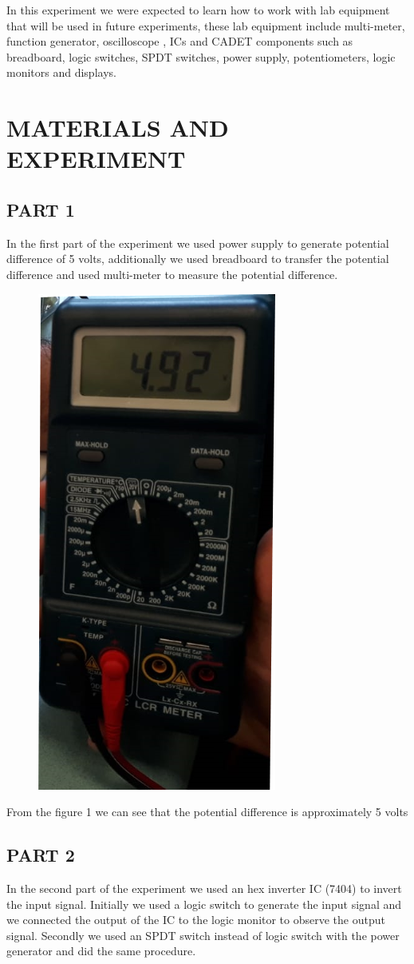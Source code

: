 \documentclass[pdftex,12pt,a4paper]{article}
\begin{document}
In this experiment we were expected to learn how to work with lab equipment that will be used in future experiments, these lab equipment include multi-meter, function generator, oscilloscope , ICs and CADET components such as breadboard, logic switches, SPDT switches, power supply, potentiometers, logic monitors and displays.

\section{MATERIALS AND EXPERIMENT}

\subsection{PART 1}
In the first part of the experiment we used power supply to generate potential difference of 5 volts, additionally we used breadboard to transfer the potential difference and used multi-meter to measure the potential difference.

\begin{figure}[h]
	\centering
	\includegraphics[height=0.5\textwidth]{1.jpg}
	\caption
	\label{Figure 1}
\end{figure}

From the figure 1 we can see that the potential difference is approximately 5 volts 

\clearpage
\subsection{PART 2}
In the second part of the experiment we used an hex inverter IC (7404) to invert the input signal. Initially we used a logic switch to generate the input signal and we connected the output of the IC to the logic monitor to observe the output signal. Secondly we used an SPDT switch instead of logic switch with the power generator and did the same procedure.
\end{document}
